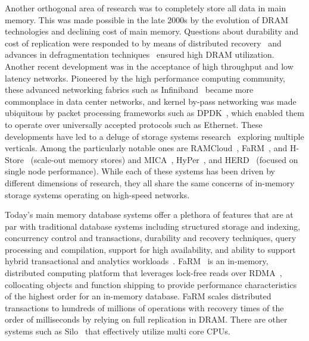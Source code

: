 Another orthogonal area of research was to completely store all data in main memory.
This was made possible in the late 2000s by the evolution of DRAM technologies and declining cost of main memory.
Questions about durability and cost of replication 
were responded to by means of distributed recovery~\cite{ongaro2011fast} and advances in defragmentation techniques~\cite{ramcloudfast} 
ensured high DRAM utilization. Another recent development was in the acceptance of high throughput and low latency networks. 
Pioneered by the high performance computing community, these advanced networking fabrics 
such as Infiniband~\cite{pfister2001introduction} became more commonplace in 
data center networks, and kernel by-pass networking was made ubiquitous by packet processing 
frameworks such as DPDK~\cite{dpdk}, which enabled them to operate over universally accepted protocols
such as Ethernet. These developments have led to a deluge of storage systems research~\cite{mmdbmstutorial} 
exploring multiple verticals. Among the particularly notable ones are RAMCloud~\cite{ramcloud},
FaRM~\cite{farm}, and H-Store~\cite{hstore} (scale-out memory stores) and
MICA~\cite{mica}, HyPer~\cite{hyper}, and HERD~\cite{herd} (focused on single node performance).
While each of these systems has been driven by different dimensions 
of research, they all share the same concerns of in-memory storage systems 
operating on high-speed networks.

Today's main memory database systems offer a plethora of features that are at par with traditional
database systems including structured storage and indexing, concurrency control and transactions,
 durability and recovery techniques, query processing and compilation, support for high availability, and 
ability to support hybrid transactional and analytics workloads~\cite{mmdbmstutorial}.
FaRM~\cite{farm} is an in-memory, distributed computing platform that leverages lock-free reads over RDMA~\cite{rdma},
collocating objects and function shipping to provide performance characteristics of the 
highest order for an in-memory database. FaRM scales distributed transactions to
hundreds of millions of operations with recovery times of the order of milliseconds by relying on 
full replication in DRAM. There are other systems such as Silo~\cite{silo} that effectively utilize multi core CPUs.

